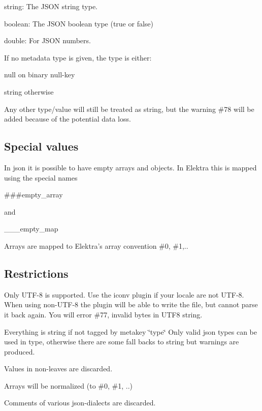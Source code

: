 \begin{DoxyItemize}
\item {\ttfamily string}\+: The J\+S\+O\+N string type.
\item {\ttfamily boolean}\+: The J\+S\+O\+N boolean type (true or false)
\item {\ttfamily double}\+: For J\+S\+O\+N numbers.
\end{DoxyItemize}

If no metadata {\ttfamily type} is given, the type is either\+:


\begin{DoxyItemize}
\item {\ttfamily null} on binary null-\/key
\item {\ttfamily string} otherwise
\end{DoxyItemize}

Any other type/value will still be treated as string, but the warning {\ttfamily \#78} will be added because of the potential data loss.

\subsection*{Special values}

In json it is possible to have empty arrays and objects. In Elektra this is mapped using the special names \begin{DoxyVerb}###empty_array
\end{DoxyVerb}


and \begin{DoxyVerb}___empty_map
\end{DoxyVerb}


Arrays are mapped to Elektra's array convention \#0, \#1,..

\subsection*{Restrictions}


\begin{DoxyItemize}
\item Only U\+T\+F-\/8 is supported. Use the {\ttfamily iconv} plugin if your locale are not U\+T\+F-\/8. When using non-\/\+U\+T\+F-\/8 the plugin will be able to write the file, but cannot parse it back again. You will error \#77, invalid bytes in U\+T\+F8 string.
\item Everything is string if not tagged by metakey \char`\"{}type\char`\"{} Only valid json types can be used in type, otherwise there are some fall backs to string but warnings are produced.
\item Values in non-\/leaves are discarded.
\item Arrays will be normalized (to \#0, \#1, ..)
\item Comments of various json-\/dialects are discarded.
\end{DoxyItemize}

